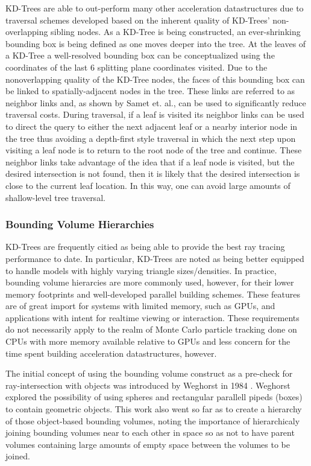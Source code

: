 \documentclass[12pt, a4paper]{article}
\begin{document}
KD-Trees are able to out-perform many other acceleration datastructures due to traversal schemes developed based on the inherent quality of KD-Trees' non-overlapping sibling nodes. As a KD-Tree is being constructed, an ever-shrinking bounding box is being defined as one moves deeper into the tree. At the leaves of a KD-Tree a well-resolved bounding box can be conceptualized using the coordinates of the last 6 splitting plane coordinates visited. Due to the nonoverlapping quality of the KD-Tree nodes, the faces of this bounding box can be linked to spatially-adjacent nodes in the tree. These links are referred to as neighbor links \cite{SAMET1989445} and, as shown by Samet et. al., can be used to significantly reduce traversal costs. During traversal, if a leaf is visited its neighbor links can be used to direct the query to either the next adjacent leaf or a nearby interior node in the tree thus avoiding a depth-first style traversal in which the next step upon visiting a leaf node is to return to the root node of the tree and continue. These neighbor links take advantage of the idea that if a leaf node is visited, but the desired intersection is not found, then it is likely that the desired intersection is close to the current leaf location. In this way, one can avoid large amounts of shallow-level tree traversal.

\subsubsection{Bounding Volume Hierarchies}%

KD-Trees are frequently citied as being able to provide the best ray tracing performance to date.\cite{ernst_2007,Hurley_2002,Havran_2000} In particular, KD-Trees are noted as being better equipped to handle models with highly varying triangle sizes/densities. In practice, bounding volume hierarcies are more commonly used, however, for their lower memory footprints and well-developed parallel building schemes. These features are of great import for systems with limited memory, such as GPUs, and applications with intent for realtime viewing or interaction. These requirements do not necessarily apply to the realm of Monte Carlo particle tracking done on CPUs with more memory available relative to GPUs and less concern for the time spent building acceleration datastructures, however. 

The initial concept of using the bounding volume construct as a pre-check for ray-intersection with objects was introduced by Weghorst in 1984 \cite{Weghorst:1984:ICM}. Weghorst explored the possibility of using spheres and rectangular parallell pipeds (boxes) to contain geometric objects. This work also went so far as to create a hierarchy of those object-based bounding volumes, noting the importance of hierarchicaly joining bounding volumes near to each other in space so as not to have parent volumes containing large amounts of empty space between the volumes to be joined.
\end{document}
